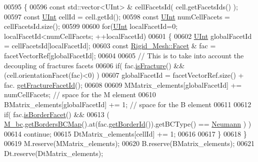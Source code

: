 \begin{DoxyCode}
00595         \{
00596         \textcolor{keyword}{const} std::vector<UInt> & cellFacetsId( cell.getFacetsIds() );
00597         \textcolor{keyword}{const} \hyperlink{namespaceFVCode3D_a4bf7e328c75d0fd504050d040ebe9eda}{UInt} cellId = cell.getId();
00598         \textcolor{keyword}{const} \hyperlink{namespaceFVCode3D_a4bf7e328c75d0fd504050d040ebe9eda}{UInt} numCellFacets = cellFacetsId.size();
00599 
00600         \textcolor{keywordflow}{for}(\hyperlink{namespaceFVCode3D_a4bf7e328c75d0fd504050d040ebe9eda}{UInt} localFacetId=0; localFacetId<numCellFacets; ++localFacetId)
00601     \{           
00602                 \hyperlink{namespaceFVCode3D_a4bf7e328c75d0fd504050d040ebe9eda}{UInt} globalFacetId = cellFacetsId[localFacetId];
00603                 \textcolor{keyword}{const} \hyperlink{classFVCode3D_1_1Rigid__Mesh_1_1Facet}{Rigid\_Mesh::Facet} & fac = facetVectorRef[globalFacetId];
00604                         
00605                 \textcolor{comment}{// This is to take into account the decoupling of fractures facets}
00606                 \textcolor{keywordflow}{if}( fac.\hyperlink{classFVCode3D_1_1Rigid__Mesh_1_1Facet_aed3f579d52847e839501f647e90c35ab}{isFracture}() && (cell.orientationFacet(fac)<0) )
00607                         globalFacetId = facetVectorRef.size() + fac.
      \hyperlink{classFVCode3D_1_1Rigid__Mesh_1_1Facet_a08dc369eccd02b29133187cede7511eb}{getFractureFacetId}();
00608 
00609                 MMatrix\_elements[globalFacetId] += numCellFacets;            \textcolor{comment}{// space for the M element}
00610                 BMatrix\_elements[globalFacetId] += 1;                        \textcolor{comment}{// space for the B element}
00611                 
00612                 \textcolor{keywordflow}{if}( fac.\hyperlink{classFVCode3D_1_1Rigid__Mesh_1_1Facet_af84dc398fca7867ff763bfca119ddc16}{isBorderFacet}() &&
00613                 ( \hyperlink{classFVCode3D_1_1global__InnerProduct_a62bbb87bc4710a73980603b8b77ffda8}{M\_bc}.\hyperlink{classFVCode3D_1_1BoundaryConditions_a5b53a81bdab88709fae14892bfe6a7c9}{getBordersBCMap}().at(fac.\hyperlink{classFVCode3D_1_1Rigid__Mesh_1_1Facet_a528828e73f43ae6fa5c858ecc5ab5a65}{getBorderId}()).getBCType() ==
       \hyperlink{namespaceFVCode3D_a73660061f11f1671164ce171a053f8c5a30212425b27314b01b40f4984dbf850a}{Neumann} ) )
00614                         \textcolor{keywordflow}{continue};
00615                 DtMatrix\_elements[cellId] += 1;    
00616                 
00617         \}
00618     \}
00619     M.reserve(MMatrix\_elements);
00620     B.reserve(BMatrix\_elements);
00621     Dt.reserve(DtMatrix\_elements);      

\end{DoxyCode}
